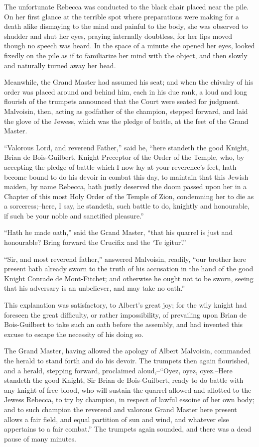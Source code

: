 The unfortunate Rebecca was conducted to the black chair placed near the
pile. On her first glance at the terrible spot where preparations were
making for a death alike dismaying to the mind and painful to the body,
she was observed to shudder and shut her eyes, praying internally
doubtless, for her lips moved though no speech was heard. In the space
of a minute she opened her eyes, looked fixedly on the pile as if to
familiarize her mind with the object, and then slowly and naturally
turned away her head.

Meanwhile, the Grand Master had assumed his seat; and when the chivalry
of his order was placed around and behind him, each in his due rank, a
loud and long flourish of the trumpets announced that the Court were
seated for judgment. Malvoisin, then, acting as godfather of the
champion, stepped forward, and laid the glove of the Jewess, which was
the pledge of battle, at the feet of the Grand Master.

``Valorous Lord, and reverend Father,'' said he, ``here standeth the
good Knight, Brian de Bois-Guilbert, Knight Preceptor of the Order of
the Temple, who, by accepting the pledge of battle which I now lay at
your reverence's feet, hath become bound to do his devoir in combat this
day, to maintain that this Jewish maiden, by name Rebecca, hath justly
deserved the doom passed upon her in a Chapter of this most Holy Order
of the Temple of Zion, condemning her to die as a sorceress;--here, I
say, he standeth, such battle to do, knightly and honourable, if such be
your noble and sanctified pleasure.''

``Hath he made oath,'' said the Grand Master, ``that his quarrel is just
and honourable? Bring forward the Crucifix and the `Te igitur'.''

``Sir, and most reverend father,'' answered Malvoisin, readily, ``our
brother here present hath already sworn to the truth of his accusation
in the hand of the good Knight Conrade de Mont-Fitchet; and otherwise he
ought not to be sworn, seeing that his adversary is an unbeliever, and
may take no oath.''

This explanation was satisfactory, to Albert's great joy; for the wily
knight had foreseen the great difficulty, or rather impossibility, of
prevailing upon Brian de Bois-Guilbert to take such an oath before the
assembly, and had invented this excuse to escape the necessity of his
doing so.

The Grand Master, having allowed the apology of Albert Malvoisin,
commanded the herald to stand forth and do his devoir. The trumpets then
again flourished, and a herald, stepping forward, proclaimed
aloud,--``Oyez, oyez, oyez.--Here standeth the good Knight, Sir Brian de
Bois-Guilbert, ready to do battle with any knight of free blood, who
will sustain the quarrel allowed and allotted to the Jewess Rebecca, to
try by champion, in respect of lawful essoine of her own body; and to
such champion the reverend and valorous Grand Master here present allows
a fair field, and equal partition of sun and wind, and whatever else
appertains to a fair combat.'' The trumpets again sounded, and there was
a dead pause of many minutes.

